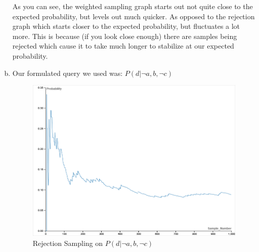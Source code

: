 \documentclass{article}
\begin{document}
\begin{enumerate}[a)]
        As you can see, the weighted sampling graph starts out not quite close to the expected probability,
        but levels out much quicker.
        As opposed to the rejection graph which starts closer to the expected probability, but fluctuates
        a lot more. This is because (if you look close enough) there are samples being rejected which cause
        it to take much longer to stabilize at our expected probability.
        
    \clearpage
    \item Our formulated query we used was: $P(d|\neg a,b, \neg c)$
        \begin{figure}[H]
            \centering
            \includegraphics[width=\linewidth]{images/rejection_sampling_ourquery.png}
            \caption{Rejection Sampling on $P(d|\neg a,b, \neg c)$}
            \label{fig:newquery_rejection_graph}
        \end{figure}
        

\end{enumerate}
\end{document}
